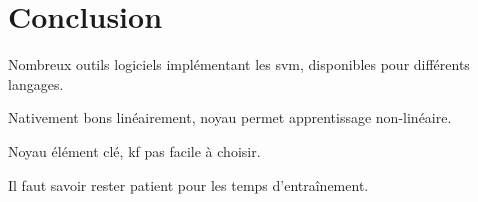 \section{Conclusion}

Nombreux outils logiciels implémentant les \gls{svm},
disponibles pour différents langages.

Nativement bons linéairement, noyau permet apprentissage non-linéaire.

Noyau élément clé, \gls{kf} pas facile à choisir.

Il faut savoir rester patient pour les temps d’entraînement.

\pagebreak
